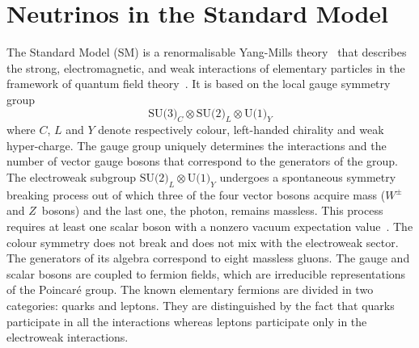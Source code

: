 
\clearpage
\chapter{Neutrinos in the Standard Model}
\label{cha:intro}

The Standard Model (SM) is a renormalisable Yang-Mills theory~\cite{Yang:1954ek} that describes the strong, %
electromagnetic, and weak interactions of elementary particles in the framework of quantum field %
theory~\cite{Glashow:1961tr, Weinberg:1967tq, Salam:1968rm}.
It is based on the local gauge symmetry group 
\begin{equation}
	\label{eq:smgroup}
	\text{SU(3)}_C \otimes \text{SU(2)}_L \otimes \text{U(1)}_Y
\end{equation}
where $C$, $L$ and $Y$ denote respectively colour, left-handed chirality and weak hyper-charge.
The gauge group uniquely determines the interactions and the number of %
vector gauge bosons that correspond to the generators of the group.
%
The electroweak subgroup $\text{SU(2)}_L \otimes \text{U(1)}_Y$ undergoes a spontaneous symmetry breaking process %
out of which three of the four vector bosons acquire mass ($W^\pm$ and $Z$~bosons) and the last one, the photon, remains massless.
This process requires at least one scalar boson with a nonzero vacuum expectation value~\cite{Higgs:1964pj, Higgs:1964ia}.
The colour symmetry does not break and does not mix with the electroweak sector. 
The generators of its algebra correspond to eight massless gluons.
The gauge and scalar bosons are coupled to fermion fields, which are irreducible representations of %
the Poincaré group.
The known elementary fermions are divided in two categories: quarks and leptons.
They are distinguished by the fact that quarks participate in all the interactions %
whereas leptons participate only in the electroweak interactions.
